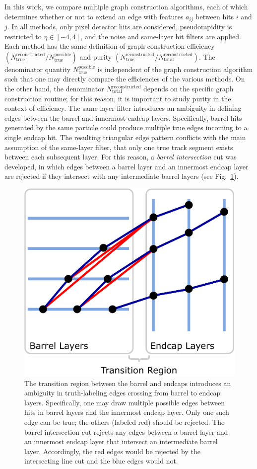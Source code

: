 \documentclass[twocolumn]{svjour3}
\begin{document}
In this work, we compare multiple graph construction algorithms, each of which determines whether or not to extend an edge with features $a_{ij}$ between hits $i$ and $j$. 
In all methods, only pixel detector hits are considered, pseudorapidity is restricted to $\eta\in[-4,4]$, and 
the noise and same-layer hit filters are applied. 
Each method has the same definition of graph construction efficiency $(N_{\mathrm{true}}^{\mathrm{reconstructed}}/N_{\mathrm{true}}^{\mathrm{possible}})$ and purity $(N_{\mathrm{true}}^{\mathrm{reconstructed}}/N_{\mathrm{total}}^{\mathrm{reconstructed}})$.
The denominator quantity $N_{\mathrm{true}}^{\mathrm{possible}}$ is independent of the graph construction algorithm such that one may directly compare the efficiencies of the various methods.
On the other hand, the denominator $N_{\mathrm{total}}^{\mathrm{reconstructed}}$ depends on the specific graph construction routine; for this reason, it is important to study purity in the context of efficiency.
The same-layer filter introduces an ambiguity in defining edges between the barrel and innermost endcap layers. 
Specifically, barrel hits generated by the same particle could produce multiple true edges incoming to a single endcap hit. 
The resulting triangular edge pattern conflicts with the main assumption of the same-layer filter, that only one true track segment exists between each subsequent layer. 
For this reason, a \textit{barrel intersection} cut was developed, in which edges between a barrel layer and an innermost endcap layer are rejected if they intersect with any intermediate barrel layers (see Fig.~\ref{fig:intersecting_line_cut}). 

\begin{figure}[!htbp]
\centering
\includegraphics[width=0.7\columnwidth]{intersecting_line_cut.pdf}
\caption{The transition region between the barrel and endcaps introduces an ambiguity in truth-labeling edges crossing from barrel to endcap layers. 
Specifically, one may draw multiple possible edges between hits in barrel layers and the innermost endcap layer. 
Only one such edge can be true; the others (labeled red) should be rejected. 
The barrel intersection cut rejects any edges between a barrel layer and an innermost endcap layer that intersect an intermediate barrel layer. 
Accordingly, the red edges would be rejected by the intersecting line cut and the blue edges would not.}
\label{fig:intersecting_line_cut} 
\end{figure}
\end{document}

